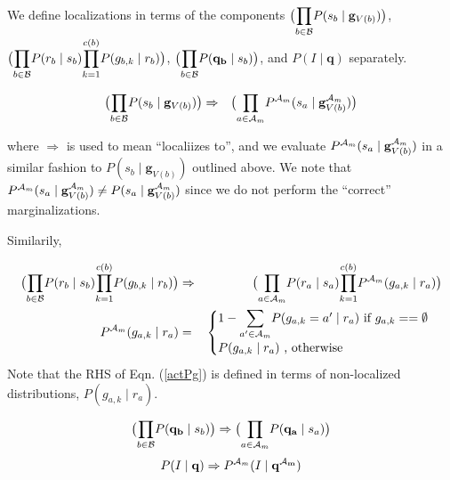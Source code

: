 \documentclass[11pt]{article}
\newcommand{\A}{{\cal A}}
\newcommand{\B}{\cal B}
\newcommand{\Am}{\A_{m}}
\begin{document}

We define localizations in terms of the components $\big({\displaystyle \prod_{b \in {\B}}} P(s_b \mid \mathbf{g}_{V(b)}) \big )$, $\big( {\displaystyle \prod_{b \in {\B}}} P(r_b \mid s_b) {\displaystyle \prod_{k=1}^{c(b)}} P(g_{b,k} \mid r_b) \big)$, $\big( {\displaystyle \prod_{b \in {\B}}} P(\mathbf{q_b} \mid s_b)\big)$, and $P(I \mid \mathbf{q})$ separately.

\begin{eqnarray}
\big({\displaystyle \prod_{b \in {\B}}} P(s_b \mid \mathbf{g}_{V(b)}) \big ) &\Rightarrow& \big({\displaystyle \prod_{a \in {\Am}}} P^{\Am}(s_a \mid \mathbf{g}^{\Am}_{V({b})}) \big )
\end{eqnarray}

where $\Rightarrow$ is used to mean ``localiizes to'', and we evaluate $P^{\Am}(s_a \mid \mathbf{g}^{\Am}_{V({b})})$ in a similar fashion to $P(s_b \mid \mathbf{g}_{V(b)})$ outlined above. We note that $P^{\Am}(s_a \mid \mathbf{g}^{\Am}_{V({b})}) \neq P(s_a \mid \mathbf{g}^{\Am}_{V({b})})$ since we do not perform the ``correct'' marginalizations.

Similarily, 

\begin{eqnarray}
\big( {\displaystyle \prod_{b \in {\B}}} P(r_b \mid s_b) {\displaystyle \prod_{k=1}^{c(b)}} P(g_{b,k} \mid r_b) \big) &\Rightarrow& \big( {\displaystyle \prod_{a \in \Am}} P(r_a \mid s_a) {\displaystyle \prod_{k=1}^{c(b)}} P^{\Am}(g_{a,k} \mid r_a) \big) \\
%
P^{\Am}(g_{a,k} \mid r_a) &=& \begin{cases} \label{actPg} 1-{\displaystyle \sum_{a' \in {\Am}}} P(g_{a,k} = a' \mid r_a) \mbox{ if } g_{a,k} == \emptyset \\
 P(g_{a,k} \mid r_a) \mbox{ , otherwise } \end{cases}
\end{eqnarray}
Note that the RHS of Eqn. (\ref{actPg}) is defined in terms of non-localized distributions, $P(g_{a,k} \mid r_a)$.

\begin{eqnarray}
\big( {\displaystyle \prod_{b \in {\B}}} P(\mathbf{q_b} \mid s_b)\big) \Rightarrow \big( {\displaystyle \prod_{a \in {\Am}}} P(\mathbf{q_a} \mid s_a)\big)
\end{eqnarray}
\begin{eqnarray}
P(I \mid \mathbf{q}) \Rightarrow P^{\Am}(I \mid \mathbf{q^{\Am}}) \label{Pim}
\end{eqnarray}
\end{document}
